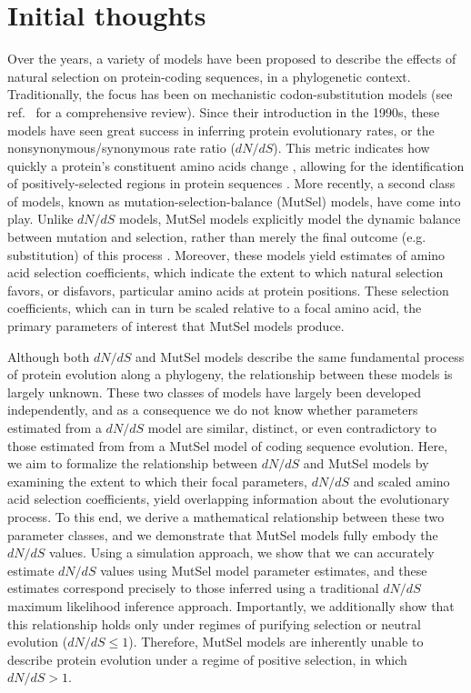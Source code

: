 \documentclass[11pt]{article}
\begin{document}
\section*{Initial thoughts}

Over the years, a variety of models have been proposed to describe the effects of natural selection on protein-coding sequences, in a phylogenetic context. Traditionally, the focus has been on mechanistic codon-substitution models (see ref.~\cite{Anisimova2009} for a comprehensive review). Since their introduction in the 1990s, these models have seen great success in inferring protein evolutionary rates, or the nonsynonymous/synonymous rate ratio ($dN/dS$). This metric indicates how quickly a protein's constituent amino acids change \cite{GoldmanYang1994, MuseGaut1994, NielsenYang1998}, allowing for the identification of positively-selected regions in protein sequences \cite{ NielsenYang1998,Yangetal2000}. 
More recently, a second class of models, known as mutation-selection-balance (MutSel) models, have come into play. Unlike $dN/dS$ models, MutSel models explicitly model the dynamic balance between mutation and selection, rather than merely the final outcome (e.g. substitution) of this process \cite{HalpernBruno1998, YangNielsen2008, Rodrigueetal2010, Tamurietal2012}. Moreover, these models yield estimates of amino acid selection coefficients, which indicate the extent to which natural selection favors, or disfavors, particular amino acids at protein positions. These selection coefficients, which can in turn be scaled relative to a focal amino acid, the primary parameters of interest that MutSel models produce.

Although both $dN/dS$ and MutSel models describe the same fundamental process of protein evolution along a phylogeny, the relationship between these models is largely unknown. These two classes of models have largely been developed independently, and as a consequence we do not know whether parameters estimated from a $dN/dS$ model are similar, distinct, or even contradictory to those estimated from from a MutSel model of coding sequence evolution. Here, we aim to formalize the relationship between $dN/dS$ and MutSel models by examining the extent to which their focal parameters, $dN/dS$ and scaled amino acid selection coefficients, yield overlapping information about the evolutionary process. To this end, we derive a mathematical relationship between these two parameter classes, and we demonstrate that MutSel models fully embody the $dN/dS$ values. Using a simulation approach, we show that we can accurately estimate $dN/dS$ values using MutSel model parameter estimates, and these estimates correspond precisely to those inferred using a traditional $dN/dS$ maximum likelihood inference approach.  Importantly, we additionally show that this relationship holds only under regimes of purifying selection or neutral evolution ($dN/dS \leq 1$). Therefore, MutSel models are inherently unable to describe protein evolution under a regime of positive selection, in which $dN/dS > 1$. 
 
\end{document}
